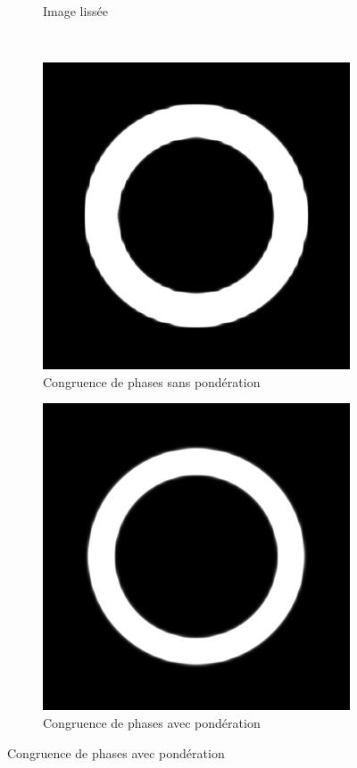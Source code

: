 \begin{figure}
\begin{subfigure}{.22\textwidth}
        \caption{Image lissée}
    \end{subfigure}
    \\
    \begin{subfigure}{.22\textwidth}
        \centering
        \includegraphics[width=\textwidth]{contenu/resources/images/pc_blur_nospread}
        \caption{Congruence de phases sans pondération}
    \end{subfigure}
    \begin{subfigure}{.22\textwidth}
        \centering
        \includegraphics[width=\textwidth]{contenu/resources/images/pc_blur_spread}
        \caption{Congruence de phases avec pondération}
    \end{subfigure}


\end{figure}
